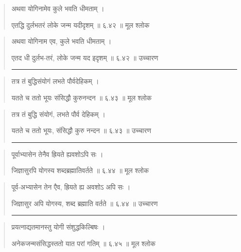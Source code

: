 \begin{quotation}  

अथवा योगिनामेव कुले भवति धीमताम्‌  ।  

एतद्धि दुर्लभतरं लोके जन्म यदीदृशम्‌  ॥ ६.४२ ॥  मूल श्लोक
\end{quotation}

\begin{quotation}

अथवा योगिनाम एव, कुले भवति धीमताम्‌  ।  

एतद धी दुर्लभ-तरं, लोके जन्म यद इदृशम्‌  ॥ ६.४२ ॥  उच्चारण

\noindent\rule{16cm}{0.4pt} 
\end{quotation}


\begin{quotation}  

तत्र तं बुद्धिसंयोगं लभते पौर्वदेहिकम्‌  ।  

यतते च ततो भूयः संसिद्धौ कुरुनन्दन  ॥ ६.४३ ॥  मूल श्लोक
\end{quotation}

\begin{quotation}

तत्र तं बुद्धि संयोगं, लभते पौर्व देहिकम्‌  ।  

यतते च ततो भूयः, संसिद्धौ कुरु नन्दन  ॥ ६.४३ ॥  उच्चारण

\noindent\rule{16cm}{0.4pt} 
\end{quotation}


\begin{quotation}  

पूर्वाभ्यासेन तेनैव ह्रियते ह्यवशोऽपि सः  ।  

जिज्ञासुरपि योगस्य शब्दब्रह्मातिवर्तते  ॥ ६.४४ ॥  मूल श्लोक
\end{quotation}

\begin{quotation}

पूर्व-अभ्यासेन तेन एैव, ह्रियते ह्य अवशोऽ अपि सः  ।  

जिज्ञासुर अपि योगस्य, शब्द ब्रह्माति वर्तते  ॥ ६.४४ ॥  उच्चारण

\noindent\rule{16cm}{0.4pt} 
\end{quotation}


\begin{quotation}  

प्रयत्नाद्यतमानस्तु योगी संशुद्धकिल्बिषः  ।  

अनेकजन्मसंसिद्धस्ततो यात परां गतिम्‌  ॥ ६.४५ ॥  मूल श्लोक
\end{quotation}

